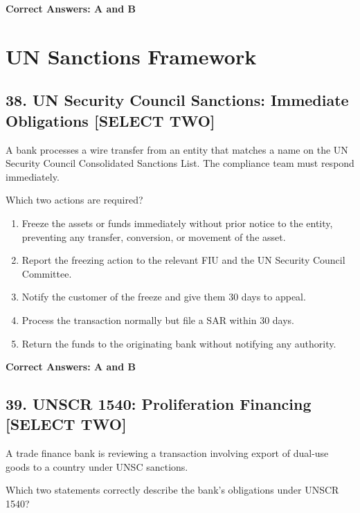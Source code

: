 \documentclass[11pt,a4paper]{article}
\begin{document}
	\textbf{Correct Answers: A and B}
	
	\section{UN Sanctions Framework}
	
	\subsection{38. UN Security Council Sanctions: Immediate Obligations \textnormal{[SELECT TWO]}}
	
	A bank processes a wire transfer from an entity that matches a name on the UN Security Council Consolidated Sanctions List. The compliance team must respond immediately.
	
	Which two actions are required?
	
	\begin{enumerate}[label=\Alph*.]
		\item Freeze the assets or funds immediately without prior notice to the entity, preventing any transfer, conversion, or movement of the asset.
		\item Report the freezing action to the relevant FIU and the UN Security Council Committee.
		\item Notify the customer of the freeze and give them 30 days to appeal.
		\item Process the transaction normally but file a SAR within 30 days.
		\item Return the funds to the originating bank without notifying any authority.
	\end{enumerate}
	
	\textbf{Correct Answers: A and B}
	
	\subsection{39. UNSCR 1540: Proliferation Financing \textnormal{[SELECT TWO]}}
	
	A trade finance bank is reviewing a transaction involving export of dual-use goods to a country under UNSC sanctions.
	
	Which two statements correctly describe the bank's obligations under UNSCR 1540?
	
\end{document}
